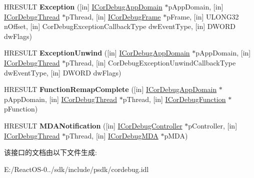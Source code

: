 \begin{DoxyCompactItemize}
H\+R\+E\+S\+U\+LT {\bfseries Exception} (\mbox{[}in\mbox{]} \hyperlink{interface_i_cor_debug_app_domain}{I\+Cor\+Debug\+App\+Domain} $\ast$p\+App\+Domain, \mbox{[}in\mbox{]} \hyperlink{interface_i_cor_debug_thread}{I\+Cor\+Debug\+Thread} $\ast$p\+Thread, \mbox{[}in\mbox{]} \hyperlink{interface_i_cor_debug_frame}{I\+Cor\+Debug\+Frame} $\ast$p\+Frame, \mbox{[}in\mbox{]} U\+L\+O\+N\+G32 n\+Offset, \mbox{[}in\mbox{]} Cor\+Debug\+Exception\+Callback\+Type dw\+Event\+Type, \mbox{[}in\mbox{]} D\+W\+O\+RD dw\+Flags)
\item 
\mbox{\label{interface_i_cor_debug_managed_callback2_a932b8980de99507ba43b538d8cbac735}} 
H\+R\+E\+S\+U\+LT {\bfseries Exception\+Unwind} (\mbox{[}in\mbox{]} \hyperlink{interface_i_cor_debug_app_domain}{I\+Cor\+Debug\+App\+Domain} $\ast$p\+App\+Domain, \mbox{[}in\mbox{]} \hyperlink{interface_i_cor_debug_thread}{I\+Cor\+Debug\+Thread} $\ast$p\+Thread, \mbox{[}in\mbox{]} Cor\+Debug\+Exception\+Unwind\+Callback\+Type dw\+Event\+Type, \mbox{[}in\mbox{]} D\+W\+O\+RD dw\+Flags)
\item 
\mbox{\label{interface_i_cor_debug_managed_callback2_a6bcd7be902beda64a9e65c041137cce1}} 
H\+R\+E\+S\+U\+LT {\bfseries Function\+Remap\+Complete} (\mbox{[}in\mbox{]} \hyperlink{interface_i_cor_debug_app_domain}{I\+Cor\+Debug\+App\+Domain} $\ast$p\+App\+Domain, \mbox{[}in\mbox{]} \hyperlink{interface_i_cor_debug_thread}{I\+Cor\+Debug\+Thread} $\ast$p\+Thread, \mbox{[}in\mbox{]} \hyperlink{interface_i_cor_debug_function}{I\+Cor\+Debug\+Function} $\ast$p\+Function)
\item 
\mbox{\label{interface_i_cor_debug_managed_callback2_aba46e6920ea195ae1edb17b6afd7d54f}} 
H\+R\+E\+S\+U\+LT {\bfseries M\+D\+A\+Notification} (\mbox{[}in\mbox{]} \hyperlink{interface_i_cor_debug_controller}{I\+Cor\+Debug\+Controller} $\ast$p\+Controller, \mbox{[}in\mbox{]} \hyperlink{interface_i_cor_debug_thread}{I\+Cor\+Debug\+Thread} $\ast$p\+Thread, \mbox{[}in\mbox{]} \hyperlink{interface_i_cor_debug_m_d_a}{I\+Cor\+Debug\+M\+DA} $\ast$p\+M\+DA)
\end{DoxyCompactItemize}


该接口的文档由以下文件生成\+:\begin{DoxyCompactItemize}
\item 
E\+:/\+React\+O\+S-\/0../sdk/include/psdk/cordebug.\+idl\end{DoxyCompactItemize}
